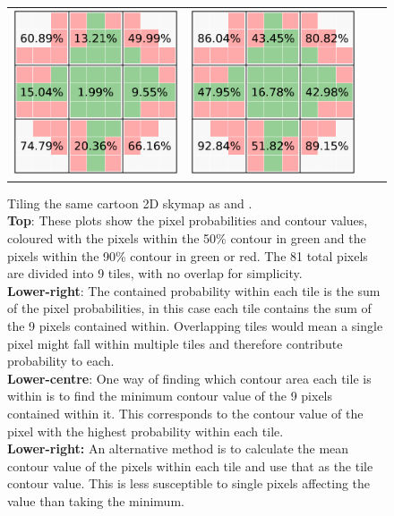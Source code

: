 \begin{colsection}
\begin{colsection}
\begin{figure}[p]
\begin{center}
\begin{tabular}{cccccc}
            \multicolumn{2}{c}{\includegraphics[width=0.3\linewidth]{images/sim/sim_skymap_tile_minconts.pdf}} &
            \multicolumn{2}{c}{\includegraphics[width=0.3\linewidth]{images/sim/sim_skymap_tile_meanconts.pdf}} \\
        \end{tabular}
    \end{center}
    \caption[Calculating tile probabilities and contours for a 2D skymap]{
        Tiling the same cartoon 2D skymap as  and .\\
        \textbf{Top}: These plots show the pixel probabilities and contour values, coloured with the pixels within the 50\% contour in green and the pixels within the 90\% contour in green or red. The 81 total pixels are divided into 9 tiles, with no overlap for simplicity.\\
        \textbf{Lower-right}: The contained probability within each tile is the sum of the pixel probabilities, in this case each tile contains the sum of the 9 pixels contained within. Overlapping tiles would mean a single pixel might fall within multiple tiles and therefore contribute probability to each.\\
        \textbf{Lower-centre}: One way of finding which contour area each tile is within is to find the minimum contour value of the 9 pixels contained within it. This corresponds to the contour value of the pixel with the highest probability within each tile.\\
        \textbf{Lower-right:} An alternative method is to calculate the mean contour value of the pixels within each tile and use that as the tile contour value. This is less susceptible to single pixels affecting the value than taking the minimum.
    }\label{fig:sim_skymap_tiles}
\end{figure}


\end{colsection}
\end{colsection}
